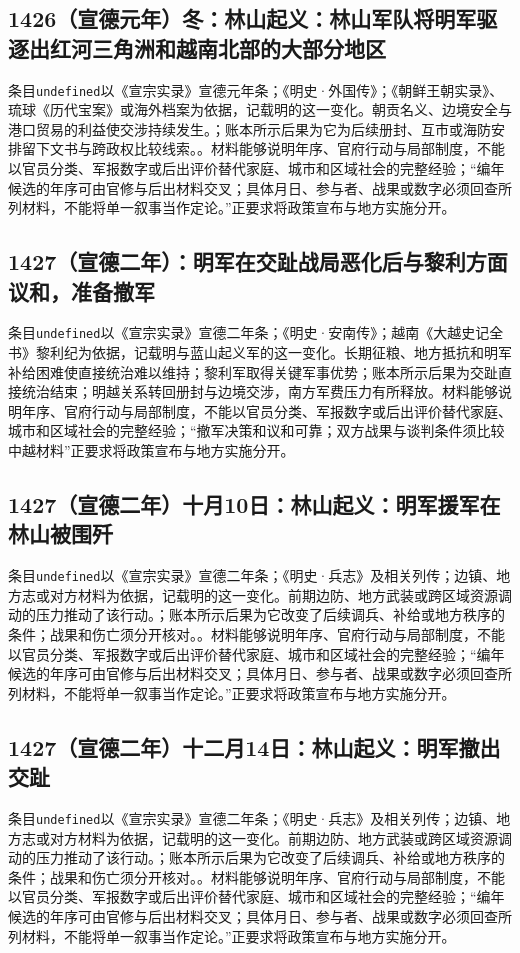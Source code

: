 \subsection{1426（宣德元年）冬：林山起义：林山军队将明军驱逐出红河三角洲和越南北部的大部分地区}
条目\texttt{undefined}以《宣宗实录》宣德元年条；《明史·外国传》；《朝鲜王朝实录》、琉球《历代宝案》或海外档案为依据，记载明的这一变化。朝贡名义、边境安全与港口贸易的利益使交涉持续发生。；账本所示后果为它为后续册封、互市或海防安排留下文书与跨政权比较线索。。材料能够说明年序、官府行动与局部制度，不能以官员分类、军报数字或后出评价替代家庭、城市和区域社会的完整经验；“编年候选的年序可由官修与后出材料交叉；具体月日、参与者、战果或数字必须回查所列材料，不能将单一叙事当作定论。”正要求将政策宣布与地方实施分开。

\subsection{1427（宣德二年）：明军在交趾战局恶化后与黎利方面议和，准备撤军}
条目\texttt{undefined}以《宣宗实录》宣德二年条；《明史·安南传》；越南《大越史记全书》黎利纪为依据，记载明与蓝山起义军的这一变化。长期征粮、地方抵抗和明军补给困难使直接统治难以维持；黎利军取得关键军事优势；账本所示后果为交趾直接统治结束；明越关系转回册封与边境交涉，南方军费压力有所释放。材料能够说明年序、官府行动与局部制度，不能以官员分类、军报数字或后出评价替代家庭、城市和区域社会的完整经验；“撤军决策和议和可靠；双方战果与谈判条件须比较中越材料”正要求将政策宣布与地方实施分开。

\subsection{1427（宣德二年）十月10日：林山起义：明军援军在林山被围歼}
条目\texttt{undefined}以《宣宗实录》宣德二年条；《明史·兵志》及相关列传；边镇、地方志或对方材料为依据，记载明的这一变化。前期边防、地方武装或跨区域资源调动的压力推动了该行动。；账本所示后果为它改变了后续调兵、补给或地方秩序的条件；战果和伤亡须分开核对。。材料能够说明年序、官府行动与局部制度，不能以官员分类、军报数字或后出评价替代家庭、城市和区域社会的完整经验；“编年候选的年序可由官修与后出材料交叉；具体月日、参与者、战果或数字必须回查所列材料，不能将单一叙事当作定论。”正要求将政策宣布与地方实施分开。

\subsection{1427（宣德二年）十二月14日：林山起义：明军撤出交趾}
条目\texttt{undefined}以《宣宗实录》宣德二年条；《明史·兵志》及相关列传；边镇、地方志或对方材料为依据，记载明的这一变化。前期边防、地方武装或跨区域资源调动的压力推动了该行动。；账本所示后果为它改变了后续调兵、补给或地方秩序的条件；战果和伤亡须分开核对。。材料能够说明年序、官府行动与局部制度，不能以官员分类、军报数字或后出评价替代家庭、城市和区域社会的完整经验；“编年候选的年序可由官修与后出材料交叉；具体月日、参与者、战果或数字必须回查所列材料，不能将单一叙事当作定论。”正要求将政策宣布与地方实施分开。

